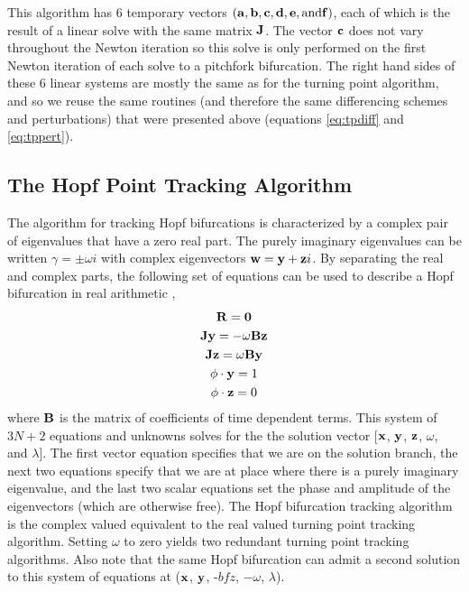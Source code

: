 This algorithm has $6$ temporary vectors $({\bf a}, {\bf b}, {\bf c}, {\bf d}, {\bf e}, \mbox{and} {\bf f})$, each of which is the result of a linear solve with the same matrix ${\bf J}$. The vector ${\bf c}$ does not vary throughout the Newton iteration so this solve is only performed on the first Newton iteration of each solve to a pitchfork bifurcation.
The right hand sides of these $6$ linear systems are mostly the same as for the turning point algorithm, and so we reuse the same routines (and therefore the same differencing schemes and perturbations) that were presented above (equations \ref{eq:tpdiff} and \ref{eq:tppert}).

\subsection{The Hopf Point Tracking Algorithm}
\label{sec:hopf}
The algorithm for tracking Hopf bifurcations is characterized by a complex pair of eigenvalues that have a zero real part.  The purely imaginary eigenvalues can be written $\gamma = \pm\omega i$ with complex eigenvectors ${\bf w} = {\bf y} + {\bf z} i$. By separating the real and complex parts, the following set of equations can be used to describe a Hopf bifurcation in real arithmetic \cite{jepson81,griewank83},
\begin{gather}
\label{eq:hp}
{\bf R}={\bf 0} \\
{\bf J} {\bf y} = - \omega {\bf B} {\bf z} \\
{\bf J} {\bf z} =  \omega {\bf B} {\bf y} \\
\phi \cdot {\bf y} = 1 \label{eq:hpnorm} \\
\phi \cdot {\bf z} = 0 \label{eq:hpnorm2}
\end{gather}
where ${\bf B}$ is the matrix of coefficients of time dependent terms.  This system of $3N+2$ equations and unknowns solves for the the solution vector [${\bf x}$, ${\bf y}$, ${\bf z}$, $\omega$, and $\lambda$]. The first vector equation specifies that we are on the solution branch, the next two equations specify that we are at place where there is a purely imaginary eigenvalue, and the last two scalar equations set the phase and amplitude of the eigenvectors (which are otherwise free).  The Hopf bifurcation tracking algorithm is the complex valued equivalent to the real valued turning point tracking algorithm. Setting $\omega$ to zero yields two redundant turning point tracking algorithms.  Also note that the same Hopf bifurcation can admit a second solution to this system of equations at (${\bf x}$, ${\bf y}$, -$bfz$, $-\omega$, $\lambda$).

